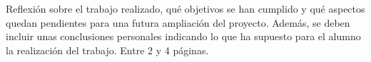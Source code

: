 Reflexión sobre el trabajo realizado, qué objetivos se han cumplido y qué aspectos quedan pendientes para una futura ampliación del proyecto. Además, se deben incluir unas conclusiones personales indicando lo que ha supuesto para el alumno la realización del trabajo. Entre 2 y 4 páginas.